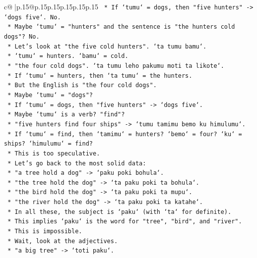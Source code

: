 \documentclass{article}
\begin{document}
{\begin{supertabular}{c@{$\;$}|p{.15\linewidth}@{}p{.15\linewidth}p{.15\linewidth}p{.15\linewidth}p{.15\linewidth}p{.15\linewidth}}
{{{\texttt{            *   If `tumu` = dogs, then "five hunters" {-}> `dogs five`. No.} \\
\texttt{            *   Maybe `tumu` = "hunters" and the sentence is "the hunters cold dogs"? No.} \\
\texttt{            *   Let's look at "the five cold hunters". `ta tumu bamu`.} \\
\texttt{            *   `tumu` = hunters. `bamu` = cold.} \\
\texttt{            *   "the four cold dogs". `ta tumu leho pakumu moti ta likote`.} \\
\texttt{            *   If `tumu` = hunters, then `ta tumu` = the hunters.} \\
\texttt{            *   But the English is "the four cold dogs".} \\
\texttt{            *   Maybe `tumu` = "dogs"?} \\
\texttt{            *   If `tumu` = dogs, then "five hunters" {-}> `dogs five`.} \\
\texttt{            *   Maybe `tumu` is a verb? "find"?} \\
\texttt{            *   "five hunters find four ships" {-}> `tumu tamimu bemo ku himulumu`.} \\
\texttt{            *   If `tumu` = find, then `tamimu` = hunters? `bemo` = four? `ku` = ships? `himulumu` = find?} \\
\texttt{            *   This is too speculative.} \\
\texttt{            *   Let's go back to the most solid data:} \\
\texttt{            *   "a tree hold a dog" {-}> `paku poki bohula`.} \\
\texttt{            *   "the tree hold the dog" {-}> `ta paku poki ta bohula`.} \\
\texttt{            *   "the bird hold the dog" {-}> `ta paku poki ta mupu`.} \\
\texttt{            *   "the river hold the dog" {-}> `ta paku poki ta katahe`.} \\
\texttt{            *   In all these, the subject is `paku` (with `ta` for definite).} \\
\texttt{            *   This implies `paku` is the word for "tree", "bird", and "river".} \\
\texttt{            *   This is impossible.} \\
\texttt{            *   Wait, look at the adjectives.} \\
\texttt{            *   "a big tree" {-}> `toti paku`.} \\
}}}
\end{supertabular}}
\end{document}
